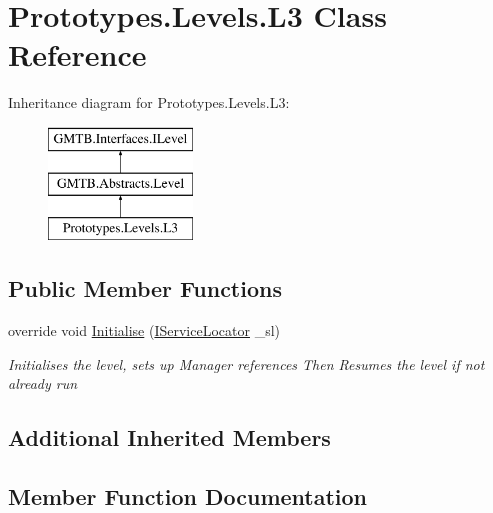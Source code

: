 \hypertarget{class_prototypes_1_1_levels_1_1_l3}{}\section{Prototypes.\+Levels.\+L3 Class Reference}
\label{class_prototypes_1_1_levels_1_1_l3}
Inheritance diagram for Prototypes.\+Levels.\+L3\+:\begin{figure}[H]
\begin{center}
\leavevmode
\includegraphics[height=3.000000cm]{class_prototypes_1_1_levels_1_1_l3}
\end{center}
\end{figure}
\subsection*{Public Member Functions}
\begin{DoxyCompactItemize}
\item 
override void \mbox{\hyperlink{class_prototypes_1_1_levels_1_1_l3_a3bc54461ba03ddd3157220c42bdc6d54}{Initialise}} (\mbox{\hyperlink{interface_g_m_t_b_1_1_interfaces_1_1_i_service_locator}{I\+Service\+Locator}} \+\_\+sl)
\begin{DoxyCompactList}\small\item\em Initialises the level, sets up Manager references Then Resumes the level if not already run \end{DoxyCompactList}\end{DoxyCompactItemize}
\subsection*{Additional Inherited Members}


\subsection{Member Function Documentation}
\mbox{\label{class_prototypes_1_1_levels_1_1_l3_a3bc54461ba03ddd3157220c42bdc6d54}} 
